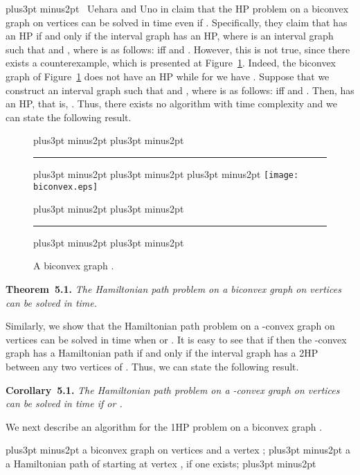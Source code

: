 \documentclass[10pt]{article}
\def\yskip{\penalty-50\vskip3pt plus3pt minus2pt}
\def\y{\yskip}
\def\yy{\yskip\yskip}
\def\s{\ }
\begin{document}
{\y {} \s Uehara and Uno in
\cite{UeharaUno} claim that the HP problem on a biconvex graph
 on  vertices can be solved in  time even if
. Specifically, they claim that  has an HP if and only
if the interval graph  has an HP, where  is an interval
graph such that  and , where
 is as follows:  iff  and
. However, this is not true,
since there exists a counterexample, which is presented at
Figure~\ref{biconvex}. Indeed, the biconvex graph  of
Figure~\ref{biconvex} does not have an HP while for  we have
. Suppose that we
construct an interval graph  such that  and
, where  is as follows:  iff  and . Then,  has an HP, that is, . Thus, there exists no algorithm with time
complexity  and we can state the following result.


\begin{figure}[t]
\yy \hrule \y\y\y
  \centering
  \texttt{[image: biconvex.eps]}
  \centering
  \caption{\small{A biconvex graph .}}
  \label{biconvex}
 \yy \hrule \y\y
\end{figure}

\bigskip
\par\noindent
{\bf Theorem~5.1.} {\it The Hamiltonian path problem on a biconvex
graph  on  vertices can be solved in  time.}

\bigskip Similarly, we show that the Hamiltonian path problem on a
-convex graph  on  vertices can be solved in
 time when  or . It is easy to see
that if  then the -convex graph  has a
Hamiltonian path if and only if the interval graph  has a 2HP
between any two vertices of . Thus, we can state the following
result.

\bigskip
\par\noindent
{\bf Corollary~5.1.} {\it The Hamiltonian path problem on a
-convex graph  on  vertices can be solved in
 time if  or .}

\bigskip We next describe an algorithm for the 1HP problem on a
biconvex graph .

\bigskip {} \y {} a biconvex graph  on  vertices and a vertex
; \y {} a a Hamiltonian path of
 starting at vertex , if one exists; \y

}
\end{document}
